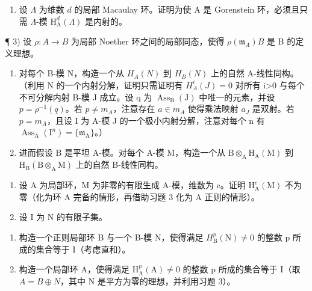 \begin{enumerate}
\def\labelenumi{\arabic{enumi})}
\setcounter{enumi}{1}
\tightlist
\item
  设 \(\Lambda\) 为维数 \(d\) 的局部 Macaulay 环。证明为使 A 是 Gorenstein 环，必须且只需 \(\Lambda\)-模 \(\mathrm{H}_{\mathrm{A}}^{d}(\Lambda)\) 是内射的。
\end{enumerate}

¶ 3) 设 \(\rho: A \to B\) 为局部 Noether 环之间的局部同态，使得 \(\rho(\mathfrak{m}_{A})B\) 是 B 的定义理想。

\begin{enumerate}
\def\labelenumi{\alph{enumi})}
\item
  对每个 B-模 N，构造一个从 \(H_{A}(N)\) 到 \(H_{B}(N)\) 上的自然 A-线性同构。（利用 N 的一个内射分解，证明只需证明有 \(H_{A}^{i}(J)=0\) 对所有 i\textgreater0 与每个不可分解内射 B-模 J 成立。设 q 为 \(\operatorname{Ass}_{\mathrm{B}}(\mathrm{J})\) 中唯一的元素，并设 \(p=\rho^{-1}(q)\)。若 \(p\neq m_{A}\)，注意存在 \(a\in m_{A}\) 使得乘法映射 \(a_{J}\) 是双射。若 \(p=m_{A}\)，且设 I 为 A-模 J 的一个极小内射分解，注意对每个 n 有 \(\operatorname{Ass}_{\mathrm{A}}(\mathrm{I}^{n})=\{\mathfrak{m}_{\mathrm{A}}\}\)。）
\item
  进而假设 B 是平坦 A-模。对每个 A-模 M，构造一个从 \(\mathrm{B}\otimes_{\mathrm{A}}\mathrm{H}_{\mathrm{A}}(\mathrm{M})\) 到 \(\mathrm{H}_{\mathrm{B}}(\mathrm{B}\otimes_{\mathrm{A}}\mathrm{M})\) 上的自然 B-线性同构。
\end{enumerate}

\begin{enumerate}
\def\labelenumi{\arabic{enumi})}
\setcounter{enumi}{3}
\item
  设 A 为局部环，M 为非零的有限生成 A-模，维数为 e。证明 \(\mathrm{H}_{\mathrm{A}}^{e}(\mathrm{M})\) 不为零（化为环 A 完备的情形，再借助习题 3 化为 A 正则的情形）。
\item
  设 I 为 N 的有限子集。
\end{enumerate}

\begin{enumerate}
\def\labelenumi{\alph{enumi})}
\item
  构造一个正则局部环 B 与一个 B-模 N，使得满足 \(H_{\mathrm{B}}^{p}(\mathrm{N}) \neq 0\) 的整数 p 所成的集合等于 I（考虑直和）。
\item
  构造一个局部环 A，使得满足 \(\mathrm{H}_{\mathrm{A}}^{p}(\mathrm{A}) \neq 0\) 的整数 p 所成的集合等于 I（取 \(A = B \oplus N\)，其中 N 是平方为零的理想，并利用习题 3）。
\end{enumerate}

